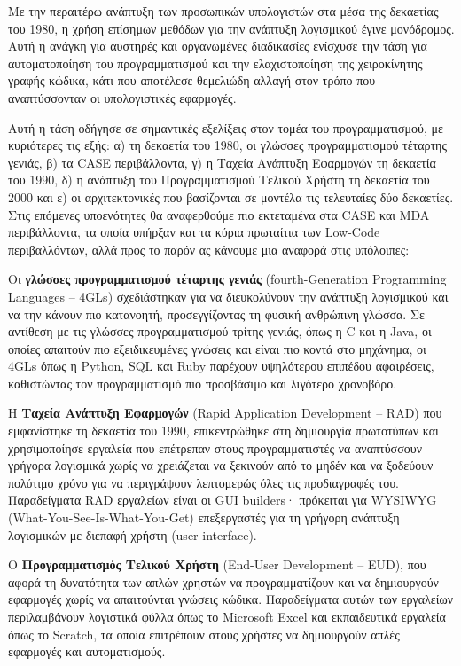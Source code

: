         Με την περαιτέρω ανάπτυξη των προσωπικών υπολογιστών στα μέσα της δεκαετίας του 1980, η χρήση επίσημων μεθόδων για την ανάπτυξη λογισμικού έγινε μονόδρομος. Αυτή η ανάγκη για αυστηρές και οργανωμένες διαδικασίες ενίσχυσε την τάση για αυτοματοποίηση του προγραμματισμού και την ελαχιστοποίηση της χειροκίνητης γραφής κώδικα, κάτι που αποτέλεσε θεμελιώδη αλλαγή στον τρόπο που αναπτύσσονταν οι υπολογιστικές εφαρμογές. \cite{Case1985, CASEChikofsky, MDELow}

        Αυτή η τάση οδήγησε σε σημαντικές εξελίξεις στον τομέα του προγραμματισμού, με κυριότερες τις εξής: α) τη δεκαετία του 1980, οι γλώσσες προγραμματισμού τέταρτης γενιάς, β) τα CASE περιβάλλοντα, γ) η Ταχεία Ανάπτυξη Εφαρμογών τη δεκαετία του 1990, δ) η ανάπτυξη του Προγραμματισμού Τελικού Χρήστη τη δεκαετία του 2000 και ε) οι αρχιτεκτονικές που βασίζονται σε μοντέλα τις τελευταίες δύο δεκαετίες. Στις επόμενες υποενότητες θα αναφερθούμε πιο εκτεταμένα στα CASE και MDA περιβάλλοντα, τα οποία υπήρξαν και τα κύρια πρωταίτια των Low-Code περιβαλλόντων, αλλά προς το παρόν ας κάνουμε μια αναφορά στις υπόλοιπες:

        Οι \textbf{γλώσσες προγραμματισμού τέταρτης γενιάς} (fourth-Generation Programming Languages -- 4GLs) σχεδιάστηκαν για να διευκολύνουν την ανάπτυξη λογισμικού και να την κάνουν πιο κατανοητή, προσεγγίζοντας τη φυσική ανθρώπινη γλώσσα. Σε αντίθεση με τις γλώσσες προγραμματισμού τρίτης γενιάς, όπως η C και η Java, οι οποίες απαιτούν πιο εξειδικευμένες γνώσεις και είναι πιο κοντά στο μηχάνημα, οι 4GLs όπως η Python, SQL και Ruby παρέχουν υψηλότερου επιπέδου αφαιρέσεις, καθιστώντας τον προγραμματισμό πιο προσβάσιμο και λιγότερο χρονοβόρο. \cite{wikipediaFourthgenerationProgramming}

        Η \textbf{Ταχεία Ανάπτυξη Εφαρμογών} (Rapid Application Development -- RAD) που εμφανίστηκε τη δεκαετία του 1990, επικεντρώθηκε στη δημιουργία πρωτοτύπων και χρησιμοποίησε εργαλεία που επέτρεπαν στους προγραμματιστές να αναπτύσσουν γρήγορα λογισμικά χωρίς να χρειάζεται να ξεκινούν από το μηδέν και να ξοδεύουν πολύτιμο χρόνο για να περιγράψουν λεπτομερώς όλες τις προδιαγραφές του. Παραδείγματα RAD εργαλείων είναι οι GUI builders· πρόκειται για WYSIWYG (What-You-See-Is-What-You-Get) επεξεργαστές για τη γρήγορη ανάπτυξη λογισμικών με διεπαφή χρήστη (user interface). \cite{wikipediaRapidApplication}

        Ο \textbf{Προγραμματισμός Τελικού Χρήστη} (End-User Development -- EUD), που αφορά τη δυνατότητα των απλών χρηστών να προγραμματίζουν και να δημιουργούν εφαρμογές χωρίς να απαιτούνται γνώσεις κώδικα. Παραδείγματα αυτών των εργαλείων περιλαμβάνουν λογιστικά φύλλα όπως το Microsoft Excel και εκπαιδευτικά εργαλεία όπως το Scratch, τα οποία επιτρέπουν στους χρήστες να δημιουργούν απλές εφαρμογές και αυτοματισμούς. \cite{wikipediaEnduserDevelopment}

